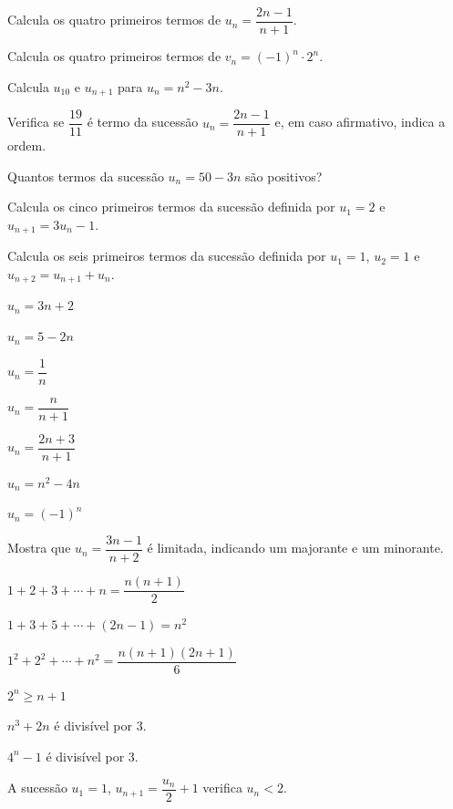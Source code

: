 \documentclass[12pt]{article}
\begin{document}


\begin{exercicios}
  \item Calcula os quatro primeiros termos de $u_n = \dfrac{2n - 1}{n + 1}$.
  \item Calcula os quatro primeiros termos de $v_n = (-1)^n \cdot 2^n$.
  \item Calcula $u_{10}$ e $u_{n+1}$ para $u_n = n^2 - 3n$.
  \item Verifica se $\dfrac{19}{11}$ é termo da sucessão $u_n = \dfrac{2n - 1}{n + 1}$ e, em caso afirmativo, indica a ordem.
  \item Quantos termos da sucessão $u_n = 50 - 3n$ são positivos?
  \item Calcula os cinco primeiros termos da sucessão definida por $u_1 = 2$ e $u_{n+1} = 3u_n - 1$.
  \item Calcula os seis primeiros termos da sucessão definida por $u_1 = 1$, $u_2 = 1$ e $u_{n+2} = u_{n+1} + u_n$.
\end{exercicios}

\begin{exercicios}
  \item $u_n = 3n + 2$
  \item $u_n = 5 - 2n$
  \item $u_n = \dfrac{1}{n}$
  \item $u_n = \dfrac{n}{n + 1}$
  \item $u_n = \dfrac{2n + 3}{n + 1}$
  \item $u_n = n^2 - 4n$
  \item $u_n = (-1)^n$
  \item Mostra que $u_n = \dfrac{3n - 1}{n + 2}$ é limitada, indicando um majorante e um minorante.
\end{exercicios}

\begin{exercicios}
  \item $1 + 2 + 3 + \cdots + n = \dfrac{n(n + 1)}{2}$
  \item $1 + 3 + 5 + \cdots + (2n - 1) = n^2$
  \item $1^2 + 2^2 + \cdots + n^2 = \dfrac{n(n + 1)(2n + 1)}{6}$
  \item $2^n \ge n + 1$
  \item $n^3 + 2n$ é divisível por 3.
  \item $4^n - 1$ é divisível por 3.
  \item A sucessão $u_1 = 1$, $u_{n+1} = \dfrac{u_n}{2} + 1$ verifica $u_n < 2$.
\end{exercicios}
\end{document}
